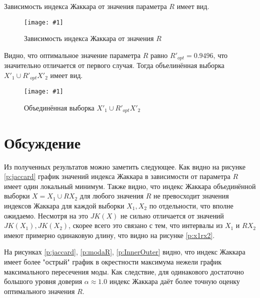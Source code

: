 \documentclass[a4paper,12pt]{article}
\newcommand{\plot}[3]{
    \begin{figure}[H]
        \begin{center}
            \texttt{[image: \#1]}
            \caption{#2}
            \label{#3}
        \end{center}
    \end{figure}
}
\begin{document}
    Зависимость индекса Жаккара от значения параметра $ R $ имеет вид.
    \plot{werr_Jaccard}{Зависимость индекса Жаккара от значения $ R $}{p:werrJaccard}

    Видно, что оптимальное значение параметра $ R $ равно $ R'_{opt} = 0.9496 $,
    что значительно отличается от первого случая. 
    Тогда объелинённая выборка $ X'_1 \cup R'_{opt} X'_2 $ имеет вид.
    \plot{werr_X1RX2}{Объединённая выборка $ X'_1 \cup R'_{opt} X'_2 $}{p:werrX1RX2}

    \section{Обсуждение}
    \quad Из полученных результатов можно заметить следующее.
    Как видно на рисунке \ref{p:jaccard} график значений индекса Жаккара
    в зависимости от параметра $ R $ имеет один локальный минимум.
    Также видно, что индекс Жаккара объединённой выборки $ X = X_1 \cup R X_2 $ для любого значения $ R $
    не превосходит значения индексов Жаккара для каждой выборки $ X_1, X_2 $ по отдельности, что вполне ожидаемо.
    Несмотря на это $ JK(X) $ не сильно отличается от значений $ JK(X_1), JK(X_2) $,
    скорее всего это связано с тем, что интервалы из $ X_1 $ и $ R X_2 $ имеют примерно одинаковую длину,
    что видно на рисунке \ref{p:x1rx2}.

    На рисунках \ref{p:jaccard}, \ref{p:modaR}, \ref{p:InnerOuter} видно,
    что индекс Жаккара имеет более "острый" график в окрестности максимума
    нежели график максимального пересечения моды.
    Как следствие, для одинакового достаточно большого уровня доверия $ \alpha \approx 1.0 $
    индекс Жаккара даёт более точную оценку оптимального значения $ R $. 
\end{document}
